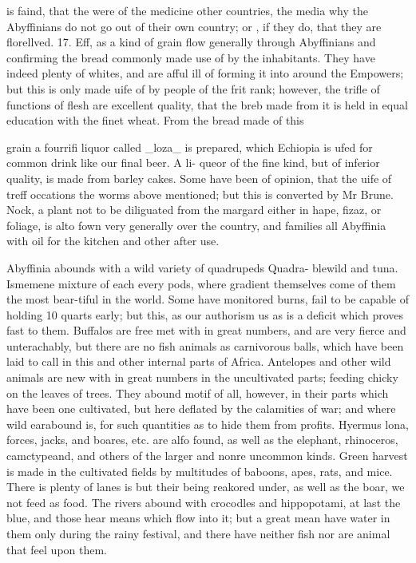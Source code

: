 \documentclass{article}
\begin{document}
is faind, that the were of the medicine other countries, the media why the Abyffinians do not go out of their own country; or , if they do, that they are florellved. 17. Eff, as a kind of grain flow generally through Abyffinians and confirming the bread commonly made use of by the inhabitants. They have indeed plenty of whites, and are afful ill of forming it into around the Empowers; but this is only made uife of by people of the frit rank; however, the trifle of functions of flesh are excellent quality, that the breb made from it is held in equal education with the finet wheat. From the bread made of this

grain a fourrifi liquor called \_loza\_ is prepared, which Echiopia is ufed for common drink like our final beer. A li- queor of the fine kind, but of inferior quality, is made from barley cakes. Some have been of opinion, that the uife of treff occations the worms above mentioned; but this is converted by Mr Brune. Nock, a plant not to be diliguated from the margard either in hape, fizaz, or foliage, is alto fown very generally over the country, and families all Abyffinia with oil for the kitchen and other after use.

Abyffinia abounds with a wild variety of quadrupeds Quadra- blewild and tuna. Ismemene mixture of each every pods, where gradient themselves come of them the most bear-tiful in the world. Some have monitored burns, fail to be capable of holding 10 quarts early; but this, as our authorism us as is a deficit which proves fast to them. Buffalos are free met with in great numbers, and are very fierce and unterachably, but there are no fish animals as carnivorous balls, which have been laid to call in this and other internal parts of Africa. Antelopes and other wild animals are new with in great numbers in the uncultivated parts; feeding chicky on the leaves of trees. They abound motif of all, however, in their parts which have been one cultivated, but here deflated by the calamities of war; and where wild earabound is, for such quantities as to hide them from profits. Hyermus lona, forces, jacks, and boares, etc. are alfo found, as well as the elephant, rhinoceros, camctypeand, and others of the larger and nonre uncommon kinds. Green harvest is made in the cultivated fields by multitudes of baboons, apes, rats, and mice. There is plenty of lanes is but their being reakored under, as well as the boar, we not feed as food. The rivers abound with crocodles and hippopotami, at last the blue, and those hear means which flow into it; but a great mean have water in them only during the rainy festival, and there have neither fish nor are animal that feel upon them.
\end{document}
